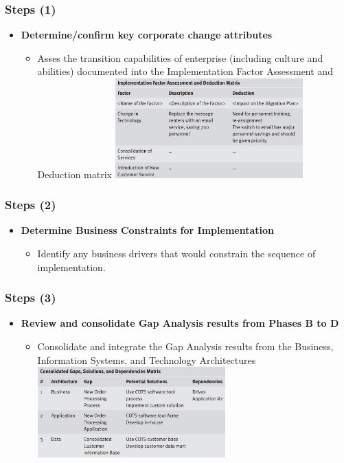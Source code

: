 \documentclass[aspectratio=169, table]{beamer}
\begin{document}
	\begin{frame}
		\frametitle{Steps (1)}
		\vspace{20pt}
		\begin{itemize}
			\item \textbf{Determine/confirm key corporate change attributes}
			\begin{itemize}
				\item Asses the transition capabilities of enterprise (including culture and abilities) documented into the Implementation Factor Assessment and Deduction matrix
				\includegraphics[width=0.6\textwidth]{../figures/factor_assessment_and_deduction_matrix.png}			
			\end{itemize}
		\end{itemize}
	\end{frame}

	\begin{frame}
		\frametitle{Steps (2)}
		\vspace{20pt}
		\begin{itemize}
			\item \textbf{Determine Business Constraints for Implementation}
			\begin{itemize}
				\item Identify any business drivers that would constrain the sequence of
				implementation.
			\end{itemize}
		\end{itemize}
	\end{frame}

	\begin{frame}
		\frametitle{Steps (3)}
		\vspace{20pt}
		\begin{itemize}
			\item \textbf{Review and consolidate Gap Analysis results from Phases B to D}
			\begin{itemize}
				\item Consolidate and integrate the Gap Analysis results from the Business, Information Systems, and Technology Architectures 
				\includegraphics[width=0.6\textwidth]{../figures/consolidated_gaps_solutions_and_depedencies_matrix.png}			
			\end{itemize}
		\end{itemize}
	\end{frame}
\end{document}
